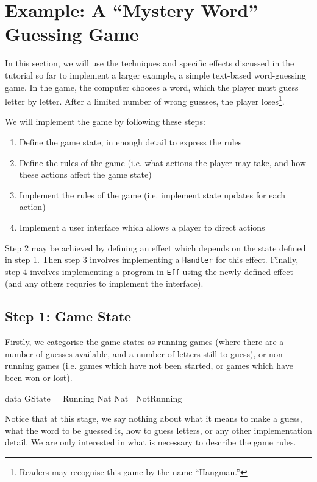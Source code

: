 \section{Example: A ``Mystery Word'' Guessing Game}

In this section, we will use the techniques and specific effects discussed
in the tutorial so far to implement a larger example, a simple text-based
word-guessing game. In the game, the computer chooses a word, which the
player must guess letter by letter. After a limited number of wrong
guesses, the player loses\footnote{Readers may recognise this game
by the name ``Hangman.''}.

We will implement the game by following these steps:

\begin{enumerate}
\item Define the game state, in enough detail to express the rules
\item Define the rules of the game (i.e. what actions the player may take, 
and how these actions affect the game state)
\item Implement the rules of the game (i.e. implement state updates for each 
action)
\item Implement a user interface which allows a player to direct actions
\end{enumerate}

\noindent
Step 2 may be achieved by defining an effect which depends on the state defined
in step 1. Then step 3 involves implementing a \texttt{Handler} for this effect.
Finally, step 4 involves implementing a program in \texttt{Eff} using the
newly defined effect (and any others requries to implement the interface).

\subsection{Step 1: Game State}

Firstly, we categorise the game states as running games (where there are a 
number of guesses available, and a number of letters still to guess), or
non-running games (i.e. games which have not been started, or games which
have been won or lost).

\begin{code}
data GState = Running Nat Nat | NotRunning
\end{code}

\noindent
Notice that at this stage, we say nothing about what it means to make a guess,
what the word to be guessed is, how to guess letters, or any other implementation
detail. We are only interested in what is necessary to describe the game
rules.

